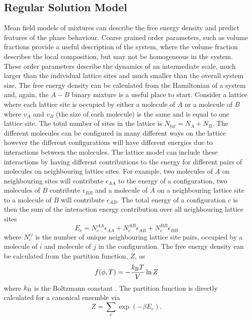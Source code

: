 \subsection{Regular Solution Model}
Mean field models of mixtures can describe the free energy density and predict features of the phase behaviour. Coarse grained order parameters, such as volume fractions provide a useful description of the system, where the volume fraction describes the local  composition, but may not be homogeneous in the system. These order parameters describe the dynamics of an intermediate scale, much larger than the individual lattice sites and much smaller than the overall system size.
The free energy density can be calculated from the Hamiltonian of a system and, again, the $A-B$ binary mixture is a useful place to start. Consider a lattice where each lattice site is occupied by either a molecule of $A$ or a molecule of $B$ where $v_A$ and $v_B$ (the size of each molecule) is the same and is equal to one lattice site. The total number of sites in the lattice  is $N_{lat} = N_A + N_B$. The different molecules can be configured in many different ways on the lattice however the different configurations will have different energies due to interactions between the molecules. The lattice model can include these interactions by having different contributions to the energy for different pairs of molecules on neighbouring lattice sites. For example, two molecules of $A$ on neighbouring sites will contribute $\epsilon_{AA}$ to the energy of a configuration, two molecules of $B$ contribute $\epsilon_{BB}$ and a molecule of $A$ on a neighbouring lattice site to a molecule of $B$ will contribute $\epsilon_{AB}$. The total energy of a configuration $c$ is then the sum of the interaction energy contribution over all neighbouring lattice sites
\begin{equation}
    E_{c} = N_c^{AA}\epsilon_{AA} + N_c^{AB}\epsilon_{AB} + N_c^{BB}\epsilon_{BB}
\end{equation}
where $N_c^{ij}$ is the number of unique neighbouring lattice site pairs, occupied by a molecule of $i$ and molecule of $j$ in the configuration. The free energy density can be calculated from the partition function, $Z$, as
\begin{equation}
    f(\phi, T) = -\frac{k_{\rm B} T}{V}\ln Z
    \label{eq:2-f_ln}
\end{equation}
where $k_{\rm B}$ is the Boltzmann constant \cite{kardar_statistical_2007}. The partition function is directly calculated for a canonical ensemble via
\begin{equation}
    Z = \sum_c \exp{(-\beta E_c)}.
    \label{eq:2-partfun}
\end{equation}
